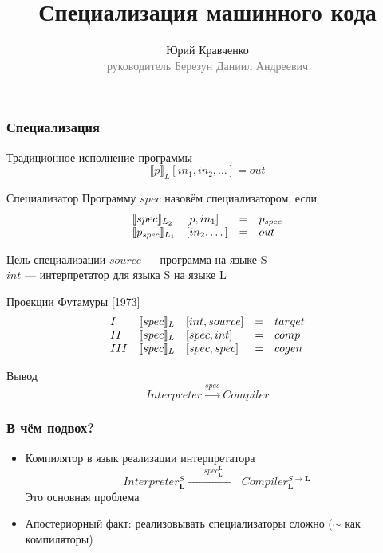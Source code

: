 \documentclass[demo]{beamer}
\begin{document}
\title{Специализация машинного кода}
\author{Юрий Кравченко\\{\footnotesize\textcolor{gray}{руководитель Березун Даниил Андреевич}}}
\frame{\titlepage}

\begin{frame}\frametitle{Специализация}
  \begin{block}{Традиционное исполнение программы}
    $$\llbracket p \rrbracket_L [in_1, in_2, \dots] = out$$
  \end{block}
  \begin{block}{Специализатор}
    Программу $spec$ назовём специализатором, если
    $$\begin{array}{l l c l}
        \llbracket spec \rrbracket_{L_2} & [p, in_1] &= &p_{spec}\\
        \llbracket p_{spec} \rrbracket_{L_1} & [in_2,\dots] &= &out
      \end{array}$$
    \end{block}
\end{frame}

\begin{frame}{Цель специализации}
  $source$ --- программа на языке S\\
  $int$ --- интерпретатор для языка S на языке L\\
  \vfill
  \begin{block}{Проекции Футамуры \hfill [1973]}
    $$
    \begin{array}{l l l c l}
      I & \llbracket spec \rrbracket_L &[int, source] &= &target\\
      II & \llbracket spec \rrbracket_L &[spec, int] &= &comp\\
      III & \llbracket spec \rrbracket_L &[spec, spec] &= &cogen
    \end{array}$$
  \end{block}
  \vfill
  \begin{block}{Вывод}
    $$Interpreter \overset{spec}{\longrightarrow} Compiler$$
  \end{block}
\end{frame}

\begin{frame}\frametitle{В чём подвох?}
  \begin{itemize}
  \item{ Компилятор в язык реализации интерпретатора
      $$Interpreter^{S}_{\mathbf{L}}
      \xrightarrow{\qquad spec^{\mathbf{L}}_{\mathbf{L}}\qquad} Compiler^{S \to \mathbf{L}}_{\mathbf{L}}$$
      \hfill {\large \color{red}Это основная проблема}
    }
    \vfill
  \item {Апостериорный факт: реализовывать специализаторы сложно ($\sim$ как компиляторы)}
  \end{itemize}
\end{frame}
\end{document}
